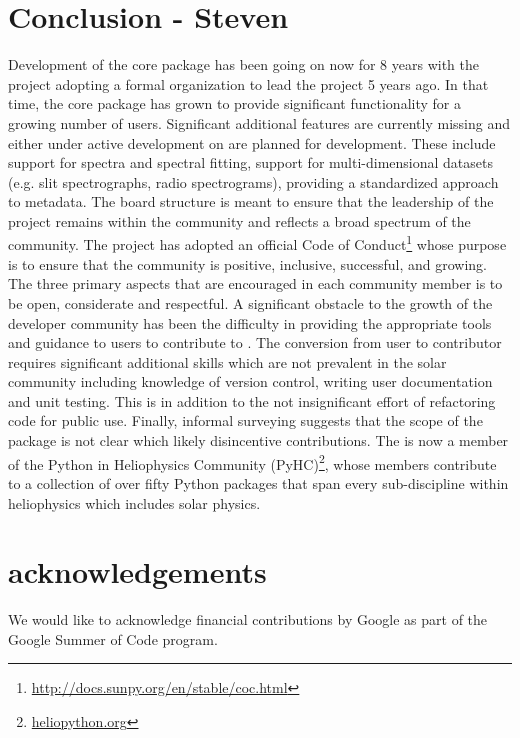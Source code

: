 \section{Conclusion - Steven}
\label{sec:conclusion}

Development of the \sunpypkg core package has been going on now for 8 years with the project adopting a formal organization to lead the project 5 years ago. 
In that time, the core package has grown to provide significant functionality for a growing number of users. 
Significant additional features are currently missing and either under active development on are planned for development. 
These include support for spectra and spectral fitting, support for multi-dimensional datasets (e.g. slit spectrographs, radio spectrograms), providing a standardized approach to metadata.
The board structure is meant to ensure that the leadership of the project remains within the community and reflects a broad spectrum of the community.
The project has adopted an official Code of Conduct\footnote{\url{http://docs.sunpy.org/en/stable/coc.html}} whose purpose is to ensure that the \sunpy community is positive, inclusive, successful, and growing. 
The three primary aspects that are encouraged in each community member is to be open, considerate and respectful. 
A significant obstacle to the growth of the developer community has been the difficulty in providing the appropriate tools and guidance to users to contribute to \sunpypkg. 
The conversion from user to contributor requires significant additional skills which are not prevalent in the solar community including knowledge of version control, writing user documentation and unit testing. 
This is in addition to the not insignificant effort of refactoring code for public use. 
Finally, informal surveying suggests that the scope of the \sunpypkg package is not clear which likely disincentive contributions. 
The \sunpyproj is now a member of the Python in Heliophysics Community (PyHC)\footnote{\url{heliopython.org}}, whose members contribute to a collection of over fifty Python packages that span every sub-discipline within heliophysics which includes solar physics. 

\section{acknowledgements}
We would like to acknowledge financial contributions by Google as part of the Google Summer of Code program.